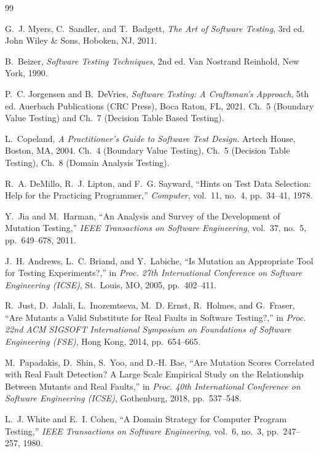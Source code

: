 \documentclass[11pt,a4paper]{article}
\begin{document}
\begin{thebibliography}{99}

G.~J. Myers, C.~Sandler, and T.~Badgett,
\emph{The Art of Software Testing}, 3rd ed.
John Wiley \& Sons, Hoboken, NJ, 2011.

B.~Beizer,
\emph{Software Testing Techniques}, 2nd ed.
Van Nostrand Reinhold, New York, 1990.

P.~C. Jorgensen and B.~DeVries,
\emph{Software Testing: A Craftsman's Approach}, 5th ed.
Auerbach Publications (CRC Press), Boca Raton, FL, 2021.
Ch.~5 (Boundary Value Testing) and Ch.~7 (Decision Table Based Testing).

L.~Copeland,
\emph{A Practitioner's Guide to Software Test Design}.
Artech House, Boston, MA, 2004. Ch.~4 (Boundary Value Testing), Ch.~5
(Decision Table Testing), Ch.~8 (Domain Analysis Testing).

R.~A. DeMillo, R.~J. Lipton, and F.~G. Sayward,
``Hints on Test Data Selection: Help for the Practicing Programmer,''
\emph{Computer}, vol.~11, no.~4, pp.~34--41, 1978.

Y.~Jia and M.~Harman,
``An Analysis and Survey of the Development of Mutation Testing,''
\emph{IEEE Transactions on Software Engineering}, vol.~37, no.~5,
pp.~649--678, 2011.

J.~H. Andrews, L.~C. Briand, and Y.~Labiche,
``Is Mutation an Appropriate Tool for Testing Experiments?,''
in \emph{Proc. 27th International Conference on Software Engineering (ICSE)},
St.~Louis, MO, 2005, pp.~402--411.

R.~Just, D.~Jalali, L.~Inozemtseva, M.~D. Ernst, R.~Holmes, and G.~Fraser,
``Are Mutants a Valid Substitute for Real Faults in Software Testing?,''
in \emph{Proc. 22nd ACM SIGSOFT International Symposium on Foundations of
Software Engineering (FSE)}, Hong Kong, 2014, pp.~654--665.

M.~Papadakis, D.~Shin, S.~Yoo, and D.-H. Bae,
``Are Mutation Scores Correlated with Real Fault Detection? A Large Scale
Empirical Study on the Relationship Between Mutants and Real Faults,''
in \emph{Proc. 40th International Conference on Software Engineering
(ICSE)}, Gothenburg, 2018, pp.~537--548.

L.~J. White and E.~I. Cohen,
``A Domain Strategy for Computer Program Testing,''
\emph{IEEE Transactions on Software Engineering}, vol.~6, no.~3,
pp.~247--257, 1980.


\end{thebibliography}
\end{document}
